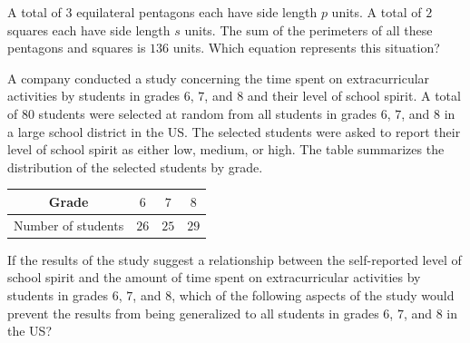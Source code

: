 \vspace{0.75em}


\vspace{2em}
\newpage

\noindent\markforreview
\vspace{1em}

A total of \(3\) equilateral pentagons each have side length \(p\) units.
A total of \(2\) squares each have side length \(s\) units.
The sum of the perimeters of all these pentagons and squares is \(136\) units.
Which equation represents this situation?

\vspace{0.75em}


\vspace{2em}
\newpage

\noindent\markforreview
\vspace{1em}

A company conducted a study concerning the time spent on extracurricular activities by students in grades \(6\), \(7\), and \(8\) and their level of school spirit.
A total of \(80\) students were selected at random from all students in grades \(6\), \(7\), and \(8\) in a large school district in the US.
The selected students were asked to report their level of school spirit as either low, medium, or high.
The table summarizes the distribution of the selected students by grade.

\begin{center}
\begin{tabular}{|c|c|c|c|}
\hline
Grade & \(6\) & \(7\) & \(8\) \\
\hline
Number of students & \(26\) & \(25\) & \(29\) \\
\hline
\end{tabular}
\end{center}

If the results of the study suggest a relationship between the self-reported level of school spirit and the amount of time spent on extracurricular activities by students in grades \(6\), \(7\), and \(8\), which of the following aspects of the study would prevent the results from being generalized to all students in grades \(6\), \(7\), and \(8\) in the US?

